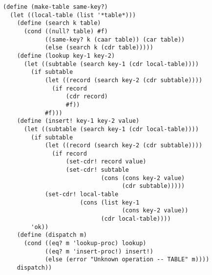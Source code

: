 \documentclass[a4paper,12pt]{article}
\begin{document}
\begin{lstlisting}
(define (make-table same-key?)
  (let ((local-table (list '*table*)))
    (define (search k table)
      (cond ((null? table) #f)
            ((same-key? k (caar table)) (car table))
            (else (search k (cdr table)))))
    (define (lookup key-1 key-2)
      (let ((subtable (search key-1 (cdr local-table))))
        (if subtable
            (let ((record (search key-2 (cdr subtable))))
              (if record
                  (cdr record)
                  #f))
            #f)))
    (define (insert! key-1 key-2 value)
      (let ((subtable (search key-1 (cdr local-table))))
        (if subtable
            (let ((record (search key-2 (cdr subtable))))
              (if record
                  (set-cdr! record value)
                  (set-cdr! subtable
                            (cons (cons key-2 value)
                                  (cdr subtable)))))
            (set-cdr! local-table
                      (cons (list key-1
                                  (cons key-2 value))
                            (cdr local-table))))
        'ok))
    (define (dispatch m)
      (cond ((eq? m 'lookup-proc) lookup)
            ((eq? m 'insert-proc!) insert!)
            (else (error "Unknown operation -- TABLE" m))))
    dispatch))
\end{lstlisting}
\end{document}
